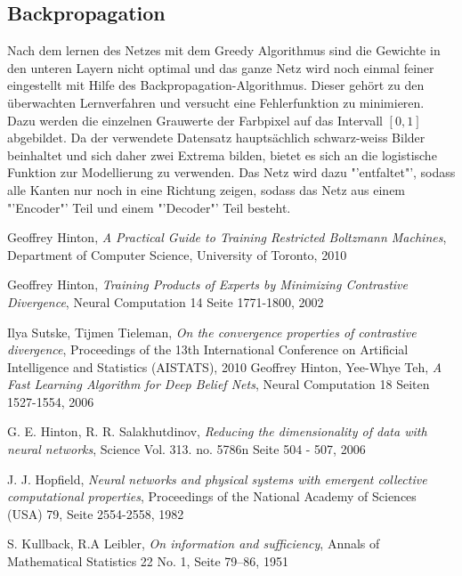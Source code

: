 \documentclass[12pt]{article}
\begin{document}
\subsection{Backpropagation}
Nach dem lernen des Netzes mit dem Greedy Algorithmus sind die Gewichte in den unteren Layern nicht optimal und das ganze Netz wird noch einmal feiner eingestellt mit Hilfe des Backpropagation-Algorithmus. Dieser gehört zu den überwachten Lernverfahren und versucht eine Fehlerfunktion zu minimieren. Dazu werden die einzelnen Grauwerte der Farbpixel auf das Intervall $[0,1]$ abgebildet. Da der verwendete Datensatz hauptsächlich schwarz-weiss Bilder beinhaltet und sich daher zwei Extrema bilden, bietet es sich an die logistische Funktion zur Modellierung zu verwenden. Das Netz wird dazu "'entfaltet"', sodass alle Kanten nur noch in eine Richtung zeigen, sodass das Netz aus einem "'Encoder"' Teil und einem "'Decoder"' Teil besteht\cite{backprop}. 

\begin{thebibliography}{9}

Geoffrey Hinton,
\emph{A Practical Guide to Training Restricted Boltzmann Machines},
Department of Computer Science, 
University of Toronto,
2010

Geoffrey Hinton,
\emph{Training Products of Experts by Minimizing Contrastive Divergence},
Neural Computation 14 Seite 1771-1800,
2002

Ilya Sutske, Tijmen Tieleman,
\emph{On the convergence properties of contrastive divergence},
Proceedings of the 13th International Conference on Artificial Intelligence and Statistics (AISTATS),
2010 
Geoffrey Hinton, Yee-Whye Teh,
\emph{A Fast Learning Algorithm for Deep Belief Nets},
Neural Computation 18 Seiten 1527-1554,
2006

G. E. Hinton, R. R. Salakhutdinov,
\emph{Reducing the dimensionality of data with neural networks},
Science Vol. 313. no. 5786n Seite 504 - 507,
2006

J. J. Hopfield,
 \emph{Neural networks and physical systems with emergent collective computational properties},
Proceedings of the National Academy of Sciences (USA) 79, Seite 2554-2558,
1982

 S. Kullback, R.A Leibler,
\emph{On information and sufficiency},
Annals of Mathematical Statistics 22 No. 1,
Seite  79–86,
 1951
\end{thebibliography}
\end{document}
